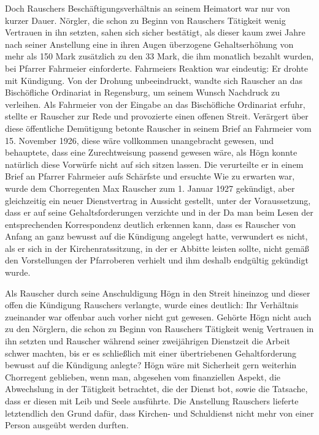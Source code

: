 Doch Rauschers Beschäftigungsverhältnis an seinem Heimatort war nur von
kurzer Dauer. Nörgler, die schon zu Beginn von Rauschers Tätigkeit
wenig Vertrauen in ihn setzten, sahen sich sicher bestätigt, als
dieser kaum zwei Jahre nach seiner Anstellung eine in ihren Augen
überzogene Gehaltserhöhung von mehr als 150 Mark zusätzlich zu den 33
Mark, die ihm monatlich bezahlt wurden, bei Pfarrer Fahrmeier
einforderte. Fahrmeiers Reaktion war eindeutig: Er drohte mit
Kündigung. Von der Drohung unbeeindruckt, wandte sich Rauscher an das
Bischöfliche Ordinariat in Regensburg, um seinem Wunsch Nachdruck zu
verleihen. Als Fahrmeier von der Eingabe an das Bischöfliche Ordinariat
erfuhr, stellte er Rauscher  zur Rede und provozierte einen offenen Streit. Verärgert
über diese öffentliche Demütigung betonte Rauscher in seinem Brief an
Fahrmeier vom 15. November 1926, diese wäre vollkommen unangebracht
gewesen, und behauptete, dass eine Zurechtweisung  passend gewesen wäre, als  Högn
konnte natürlich diese Vorwürfe nicht auf sich sitzen lassen. Die
 verurteilte er in einem
Brief an Pfarrer Fahrmeier aufs Schärfste und ersuchte
 Wie
zu erwarten war, wurde dem Chorregenten Max Rauscher zum 1. Januar 1927
gekündigt, aber gleichzeitig ein neuer Dienstvertrag in Aussicht
gestellt, unter der Voraussetzung, dass er auf seine Gehaltsforderungen
verzichte und in der  Da man beim Lesen der entsprechenden Korrespondenz deutlich
erkennen kann, dass es Rauscher von Anfang an ganz bewusst auf die
Kündigung angelegt hatte, verwundert es nicht, als er sich in der
Kirchenratssitzung, in der er Abbitte leisten sollte, nicht gemäß den
Vorstellungen der Pfarroberen verhielt und ihm deshalb endgültig
gekündigt wurde.

Als Rauscher durch seine Anschuldigung Högn in den Streit hineinzog und
dieser offen die Kündigung Rauschers verlangte, wurde eines deutlich:
Ihr Verhältnis zueinander war offenbar auch vorher nicht gut gewesen.
Gehörte Högn nicht auch zu den Nörglern, die schon zu Beginn von
Rauschers Tätigkeit wenig Vertrauen in ihn setzten und Rauscher
während seiner zweijährigen Dienstzeit die Arbeit schwer machten, bis
er es schließlich mit einer übertriebenen Gehaltforderung bewusst auf
die Kündigung anlegte? Högn wäre mit Sicherheit gern weiterhin
Chorregent geblieben, wenn man, abgesehen vom finanziellen Aspekt, die
Abwechslung in der Tätigkeit betrachtet, die der Dienst bot, sowie die
Tatsache, dass er diesen mit Leib und Seele ausführte. Die Anstellung
Rauschers lieferte letztendlich den Grund dafür, dass Kirchen- und
Schuldienst nicht mehr von einer Person ausgeübt werden durften.

